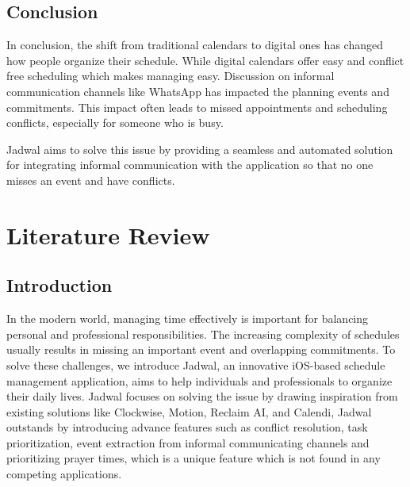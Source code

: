 \documentclass[12pt,a4paper]{report}
\begin{document}
\section{Conclusion}

In conclusion, the shift from traditional calendars to digital ones has changed how people organize their schedule. While digital calendars offer easy and conflict free scheduling which makes managing easy. Discussion on informal communication channels like WhatsApp has impacted the planning events and commitments. This impact often leads to missed appointments and scheduling conflicts, especially for someone who is busy.

Jadwal aims to solve this issue by providing a seamless and automated solution for integrating informal communication with the application so that no one misses an event and have conflicts. 

\chapter{Literature Review}

\section{Introduction}
In the modern world, managing time effectively is important for balancing personal and professional responsibilities. The increasing complexity of schedules usually results in missing an important event and overlapping commitments. To solve these challenges, we introduce Jadwal, an innovative iOS-based schedule management application, aims to help individuals and professionals to organize their daily lives.
Jadwal focuses on solving the issue by drawing inspiration from existing solutions like Clockwise, Motion, Reclaim AI, and Calendi, Jadwal outstands by introducing advance features such as conflict resolution, task prioritization, event extraction from informal communicating channels and prioritizing prayer times, which is a unique feature which is not found in any competing applications. 
\end{document}

